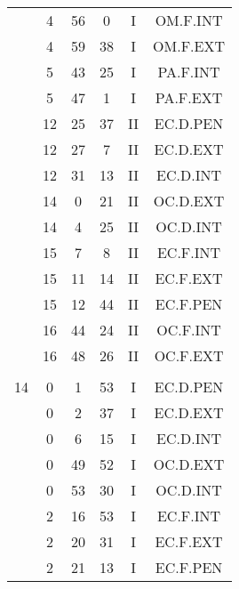 \documentclass[12pt, a4paper]{article}
\begin{document}
\begin{multicols}{3}
{\begin{tabular}{c c c c c c}
	 	 	 	 & 4 & 56 & 0 & I & OM.F.INT\\%
	 	 	 	 & 4 & 59 & 38 & I & OM.F.EXT\\%
	 	 	 	 & 5 & 43 & 25 & I & PA.F.INT\\%
	 	 	 	 & 5 & 47 & 1 & I & PA.F.EXT\\%
	 	 	 	 & 12 & 25 & 37 & II & EC.D.PEN\\%
	 	 	 	 & 12 & 27 & 7 & II & EC.D.EXT\\%
	 	 	 	 & 12 & 31 & 13 & II & EC.D.INT\\%
	 	 	 	 & 14 & 0 & 21 & II & OC.D.EXT\\%
	 	 	 	 & 14 & 4 & 25 & II & OC.D.INT\\%
	 	 	 	 & 15 & 7 & 8 & II & EC.F.INT\\%
	 	 	 	 & 15 & 11 & 14 & II & EC.F.EXT\\%
	 	 	 	 & 15 & 12 & 44 & II & EC.F.PEN\\%
	 	 	 	 & 16 & 44 & 24 & II & OC.F.INT\\%
	 	 	 	 & 16 & 48 & 26 & II & OC.F.EXT\\%
	 	 	 	 & & & & & \\%
	 	 	 	14 & 0 & 1 & 53 & I & EC.D.PEN\\%
	 	 	 	 & 0 & 2 & 37 & I & EC.D.EXT\\%
	 	 	 	 & 0 & 6 & 15 & I & EC.D.INT\\%
	 	 	 	 & 0 & 49 & 52 & I & OC.D.EXT\\%
	 	 	 	 & 0 & 53 & 30 & I & OC.D.INT\\%
	 	 	 	 & 2 & 16 & 53 & I & EC.F.INT\\%
	 	 	 	 & 2 & 20 & 31 & I & EC.F.EXT\\%
	 	 	 	 & 2 & 21 & 13 & I & EC.F.PEN\\%

\end{tabular}}
\end{multicols}
\end{document}
